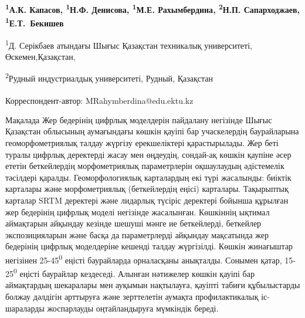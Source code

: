 
\begin{articleheader}

{\bfseries
\textsuperscript{1}А.К. Капасов,
\textsuperscript{1}Н.Ф. Денисова,
\textsuperscript{1}М.Е. Рахымбердина\textsuperscript{\envelope },
\textsuperscript{2}Н.П. Сапарходжаев,
\textsuperscript{1}Е.Т.~Бекишев
}
\end{articleheader}


\begin{affiliation}
\textsuperscript{1}Д. Серікбаев атындағы Шығыс Қазақстан техникалық университеті, Өскемен,Қазақстан,

\textsuperscript{2}Рудный индустриалдық университеті, Рудный, Қазақстан

\raggedright \textsuperscript{\envelope }Корреспондент-автор: MRahymberdina@edu.ektu.kz
\end{affiliation}

Мақалада Жер бедерінің цифрлық моделдерін пайдалану негізінде Шығыс
Қазақстан облысының аумағындағы көшкін қауіпі бар учаскелердің
баурайларына геоморфометриялық талдау жүргізу ерекшеліктері
қарастырылады. Жер беті туралы цифрлық деректерді жасау мен өңдеудің,
сондай-ақ көшкін қаупіне әсер ететін беткейлердің морфометриялық
параметрлерін оқшаулаудың әдістемелік тәсілдері қаралды.
Геоморфологиялық карталардың екі түрі жасалынды: биіктік карталары және
морфометриялық (беткейлердің еңісі) карталары. Тақырыптық карталар SRTM
деректері және лидарлық түсіріс деректері бойынша құрылған жер бедерінің
цифрлық моделі негізінде жасалынған. Көшкіннің ықтимал аймақтарын
айқындау кезінде шешуші мәнге ие беткейлерді, беткейлер экспозицияларын
және басқа да параметрлерді айқындау мақсатында жер бедерінің цифрлық
моделдеріне кешенді талдау жүргізілді. Көшкін жинағыштар негізінен
25-45\textsuperscript{0} еңісті баурайларда орналасқаны анықталды.
Сонымен қатар, 15-25\textsuperscript{0} еңісті баурайлар кездеседі.
Алынған нәтижелер көшкін қауіпі бар аймақтардың шекаралары мен ауқымын
нақтылауға, қауіпті табиғи құбылыстарды болжау дәлдігін арттыруға және
зерттелетін аумақта профилактикалық іс-шараларды жоспарлауды
оңтайландыруға мүмкіндік береді.


